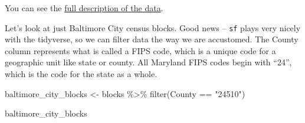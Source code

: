 \documentclass[
  letterpaper,
  DIV=11,
  numbers=noendperiod]{scrreprt}
\newenvironment{Shaded}{\begin{snugshade}}{\end{snugshade}}
\newcommand{\FunctionTok}[1]{\textcolor[rgb]{0.28,0.35,0.67}{#1}}
\newcommand{\NormalTok}[1]{\textcolor[rgb]{0.00,0.23,0.31}{#1}}
\newcommand{\OtherTok}[1]{\textcolor[rgb]{0.00,0.23,0.31}{#1}}
\newcommand{\SpecialCharTok}[1]{\textcolor[rgb]{0.37,0.37,0.37}{#1}}
\newcommand{\StringTok}[1]{\textcolor[rgb]{0.13,0.47,0.30}{#1}}
\begin{document}
You can see the
\href{https://redistricting.maryland.gov/Documents/Data/DataDictionary.pdf}{full
description of the data}.

Let's look at just Baltimore City census blocks. Good news --
\texttt{sf} plays very nicely with the tidyverse, so we can filter data
the way we are accustomed. The County column represents what is called a
FIPS code, which is a unique code for a geographic unit like state or
county. All Maryland FIPS codes begin with ``24'', which is the code for
the state as a whole.

\begin{Shaded}
\begin{Highlighting}[]
\NormalTok{baltimore\_city\_blocks }\OtherTok{\textless{}{-}}\NormalTok{ blocks }\SpecialCharTok{\%\textgreater{}\%}
  \FunctionTok{filter}\NormalTok{(County }\SpecialCharTok{==} \StringTok{"24510"}\NormalTok{)}

\NormalTok{baltimore\_city\_blocks}
\end{Highlighting}
\end{Shaded}
\end{document}
